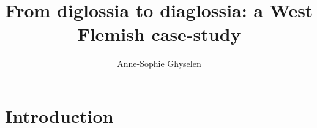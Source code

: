 \documentclass[output=paper]{LSP/langsci}
\author{Anne-Sophie Ghyselen\affiliation{Ghent University}}
\title{From diglossia to diaglossia: a {W}est {F}lemish case-study}
\begin{document}
\newcommand{\ghysvara}{[-st,+ypr]~}
\newcommand{\ghysvarb}{[+st,+ypr]~}
\newcommand{\ghysvarc}{[-st,-ypr]~}
\newcommand{\ghysvard}{[+st,-ypr]~}


\newcommand{\tabitem}{{\textbullet}~~}
 
 

\section{Introduction}
\label{sec:introduction}
\end{document}
